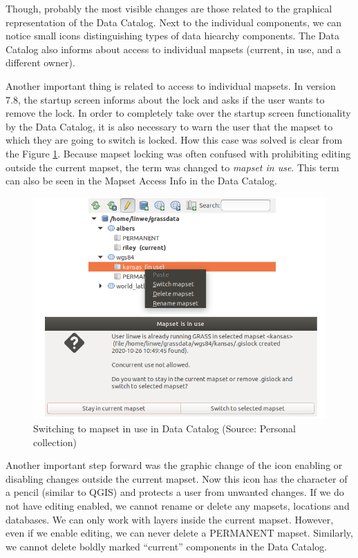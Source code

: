 \documentclass[a4paper,10pt,twoside]{article}
\begin{document}
\newpage Though, probably the most visible changes are those related to the graphical representation of the Data Catalog. Next to the individual components, we can notice small icons distinguishing types of data hiearchy components. The Data Catalog also informs about access to individual mapsets (current, in use, and a different owner).

Another important thing is related to access to individual mapsets. In version 7.8, the startup screen informs about the lock and asks if the user wants to remove the lock.
In order to completely take over the startup screen functionality by the Data Catalog, it is also necessary to warn the user that the mapset to which they are going to switch is locked. How this case was solved is clear from the Figure \ref{fig:data_catalog_switch_new}. Because mapset locking was often confused with prohibiting editing outside the current mapset, the term was changed to \textit{mapset in use}. This term can also be seen in the Mapset Access Info in the Data Catalog.

\vspace{0.3cm}
\begin{figure}[hbt!] 
\begin{center}
\includegraphics[width=13cm]{../pictures/data_catalog_switch.png} 
\caption[Switching to mapset in use in Data Catalog]{Switching to mapset in use in Data Catalog (Source: Personal collection)}
\label{fig:data_catalog_switch_new}
\end{center}
\end{figure}

\noindent Another important step forward was the graphic change of the icon enabling or disabling changes outside the current mapset. Now this icon has the character of a pencil (similar to QGIS) and protects a user from unwanted changes. If we do not have editing enabled, we cannot rename or delete any mapsets, locations and databases. We can only work with layers inside the current mapset. However, even if we enable editing, we can never delete a PERMANENT mapset. Similarly, we cannot delete boldly marked ``current” components in the Data Catalog.
\end{document}
